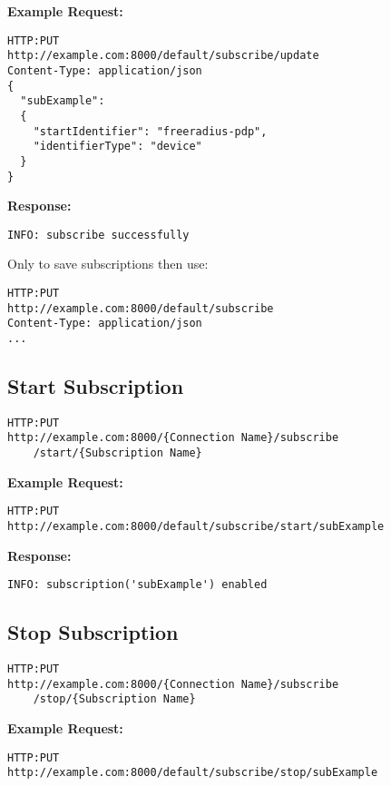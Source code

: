 \begin{minipage}{\linewidth}
\textbf{Example Request:}
\begin{lstlisting}
HTTP:PUT
http://example.com:8000/default/subscribe/update
Content-Type: application/json
{
  "subExample":
  {
    "startIdentifier": "freeradius-pdp",
    "identifierType": "device"
  }
}
\end{lstlisting}
\end{minipage}

\begin{minipage}{\linewidth}
\textbf{Response:}
\begin{lstlisting}
INFO: subscribe successfully
\end{lstlisting}
\end{minipage}

Only to save subscriptions then use:

\begin{lstlisting}
HTTP:PUT
http://example.com:8000/default/subscribe
Content-Type: application/json
...
\end{lstlisting}

\subsection{Start Subscription}
\begin{lstlisting}
HTTP:PUT
http://example.com:8000/{Connection Name}/subscribe
	/start/{Subscription Name}
\end{lstlisting}

\textbf{Example Request:}
\begin{lstlisting}
HTTP:PUT
http://example.com:8000/default/subscribe/start/subExample
\end{lstlisting}

\textbf{Response:}
\begin{lstlisting}
INFO: subscription('subExample') enabled
\end{lstlisting}

\subsection{Stop Subscription}
\begin{lstlisting}
HTTP:PUT
http://example.com:8000/{Connection Name}/subscribe
	/stop/{Subscription Name}
\end{lstlisting}

\textbf{Example Request:}
\begin{lstlisting}
HTTP:PUT
http://example.com:8000/default/subscribe/stop/subExample
\end{lstlisting}

